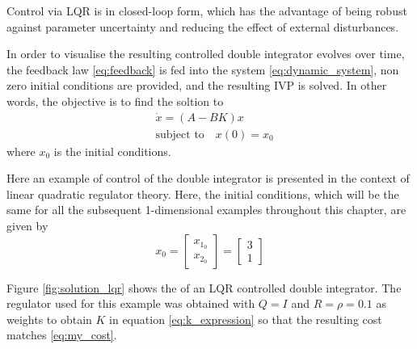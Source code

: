 \par Control via LQR is in closed-loop form, which has the advantage of being robust against parameter uncertainty and reducing the effect of external disturbances. 
\par In order to visualise the resulting controlled double integrator evolves over time, the feedback law \eqref{eq:feedback} is fed into the system \eqref{eq:dynamic_system}, non zero initial conditions are provided, and the resulting \ac{IVP} is solved. In other words, the objective is to find the soltion to 
\begin{equation}
    \begin{aligned}
    & \dot{x} = (A-BK)x \\
    & \text{subject to} \quad x(0) = x_0
    \end{aligned}
    \label{eq:controlledlinearsystem}
\end{equation}
where $x_0$ is the initial conditions.



\par Here an example of control of the double integrator is presented in the context of linear quadratic regulator theory. Here, the initial conditions, which will be the same for all the subsequent 1-dimensional examples throughout this chapter, are  given by
\begin{equation}
    \label{eq:initial_conds}
    x_0 = \begin{bmatrix} x_{1_0} \\ x_{2_0} \end{bmatrix} = \begin{bmatrix} 3 \\ 1 \end{bmatrix}
\end{equation}

\par Figure \ref{fig:solution_lqr} shows the of an \ac{LQR} controlled double integrator. The regulator used for this example was obtained with $Q = I$ and $R = \rho = 0.1$ as weights to obtain $K$ in equation \ref{eq:k_expression} so that the resulting cost matches \ref{eq:my_cost}.



